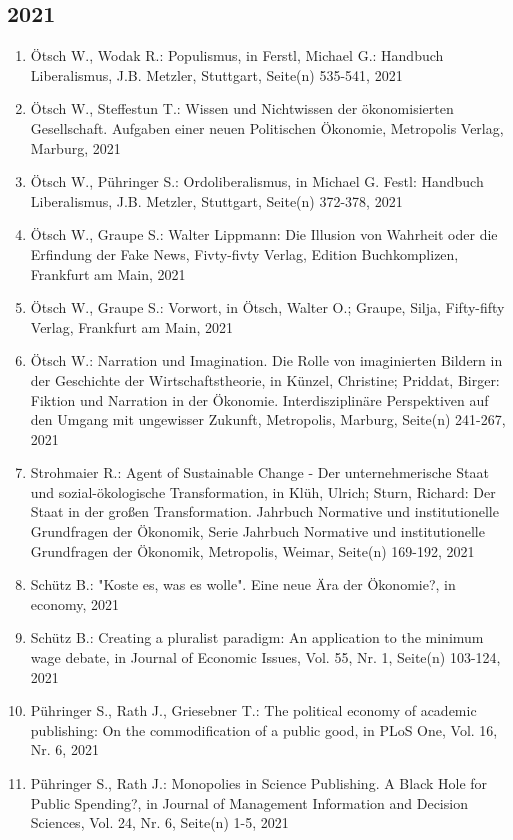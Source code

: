\subsection*{2021}
\begin{enumerate}
    	 \item Ötsch W., Wodak R.: Populismus, in Ferstl, Michael G.: Handbuch Liberalismus, J.B. Metzler, Stuttgart, Seite(n) 535-541, 2021
	 \item Ötsch W., Steffestun T.: Wissen und Nichtwissen der ökonomisierten Gesellschaft. Aufgaben einer neuen Politischen Ökonomie, Metropolis Verlag, Marburg, 2021
	 \item Ötsch W., Pühringer S.: Ordoliberalismus, in Michael G. Festl: Handbuch Liberalismus, J.B. Metzler, Stuttgart, Seite(n) 372-378, 2021
	 \item Ötsch W., Graupe S.: Walter Lippmann: Die Illusion von Wahrheit oder die Erfindung der Fake News, Fivty-fivty Verlag, Edition Buchkomplizen, Frankfurt am Main, 2021
	 \item Ötsch W., Graupe S.: Vorwort, in Ötsch, Walter O.; Graupe, Silja, Fifty-fifty Verlag, Frankfurt am Main, 2021
	 \item Ötsch W.: Narration und Imagination. Die Rolle von imaginierten Bildern in der Geschichte der Wirtschaftstheorie, in Künzel, Christine; Priddat, Birger: Fiktion und Narration in der Ökonomie. Interdisziplinäre Perspektiven auf den Umgang mit ungewisser Zukunft, Metropolis, Marburg, Seite(n) 241-267, 2021
	 \item Strohmaier R.: Agent of Sustainable Change - Der unternehmerische Staat und sozial-ökologische Transformation, in Klüh, Ulrich; Sturn, Richard: Der Staat in der großen Transformation. Jahrbuch Normative und institutionelle Grundfragen der Ökonomik, Serie Jahrbuch Normative und institutionelle Grundfragen der Ökonomik, Metropolis, Weimar, Seite(n) 169-192, 2021
	 \item Schütz B.: "Koste es, was es wolle". Eine neue Ära der Ökonomie?, in economy, 2021
	 \item Schütz B.: Creating a pluralist paradigm: An application to the minimum wage debate, in Journal of Economic Issues, Vol. 55, Nr. 1, Seite(n) 103-124, 2021
	 \item Pühringer S., Rath J., Griesebner T.: The political economy of academic publishing: On the commodification of a public good, in PLoS One, Vol. 16, Nr. 6, 2021
	 \item Pühringer S., Rath J.: Monopolies in Science Publishing. A Black Hole for Public Spending?, in Journal of Management Information and Decision Sciences, Vol. 24, Nr. 6, Seite(n) 1-5, 2021

\end{enumerate}
